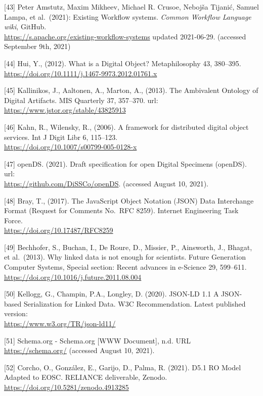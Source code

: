 {[}43{]} Peter Amstutz, Maxim Mikheev, Michael R. Crusoe, Nebojša
Tijanić, Samuel Lampa, et al.~(2021): Existing Workflow systems.
\emph{Common Workflow Language wiki}, GitHub.\\
\url{https://s.apache.org/existing-workflow-systems} updated 2021-06-29.
(accessed September 9th, 2021)

{[}44{]} Hui, Y., (2012). What is a Digital Object? Metaphilosophy 43,
380--395.\\
\url{https://doi.org/10.1111/j.1467-9973.2012.01761.x}

{[}45{]} Kallinikos, J., Aaltonen, A., Marton, A., (2013). The
Ambivalent Ontology of Digital Artifacts. MIS Quarterly 37, 357--370.
url:\\
\url{https://www.jstor.org/stable/43825913}

{[}46{]} Kahn, R., Wilensky, R., (2006). A framework for distributed
digital object services. Int J Digit Libr 6, 115--123.\\
\url{https://doi.org/10.1007/s00799-005-0128-x}

{[}47{]} openDS. (2021). Draft specification for open Digital Specimens
(openDS). url:\\
\url{https://github.com/DiSSCo/openDS}. (accessed August 10, 2021).

{[}48{]} Bray, T., (2017). The JavaScript Object Notation (JSON) Data
Interchange Format (Request for Comments No.~RFC 8259). Internet
Engineering Task Force.\\
\url{https://doi.org/10.17487/RFC8259}

{[}49{]} Bechhofer, S., Buchan, I., De Roure, D., Missier, P.,
Ainsworth, J., Bhagat, et al.~(2013). Why linked data is not enough for
scientists. Future Generation Computer Systems, Special section: Recent
advances in e-Science 29, 599--611.\\
\url{https://doi.org/10.1016/j.future.2011.08.004}

{[}50{]} Kellogg, G., Champin, P.A., Longley, D. (2020). JSON-LD 1.1 A
JSON-based Serialization for Linked Data. W3C Recommendation. Latest
published version:\\
\url{https://www.w3.org/TR/json-ld11/}

{[}51{]} Schema.org - Schema.org {[}WWW Document{]}, n.d. URL\\
\url{https://schema.org/} (accessed August 10, 2021).

{[}52{]} Corcho, O., González, E., Garijo, D., Palma, R. (2021). D5.1 RO
Model Adapted to EOSC. RELIANCE deliverable, Zenodo.\\
\url{https://doi.org/10.5281/zenodo.4913285}

